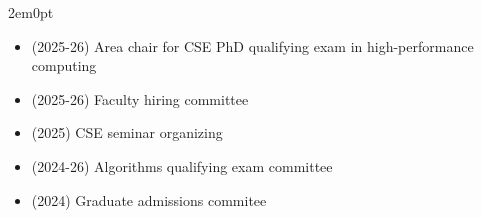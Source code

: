 \begin{adjustwidth}{2em}{0pt}
\begin{itemize}
    \item (2025-26) Area chair for CSE PhD qualifying exam in high-performance computing
    \item (2025-26) Faculty hiring committee
        \item (2025) CSE seminar organizing
    \item (2024-26) Algorithms qualifying exam committee
    \item (2024) Graduate admissions commitee
\end{itemize}
\fi
\end{adjustwidth}



